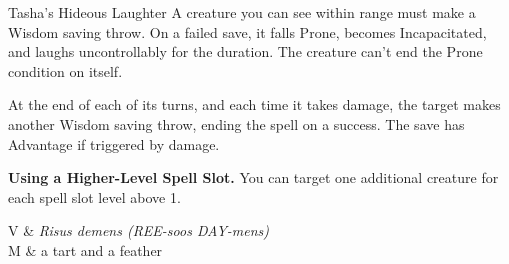 \begin{Spell}[
  tags=Concentration,
  level={1st},
  time={1 action},
  range={30 ft},
  components={V, S, M},
  duration={1 minute},
  school={Enchantment},
  attack={WIS Save},
  effect={Control}
]{Tasha's Hideous Laughter}
A creature you can see within range must make a Wisdom saving throw. On a failed save, it falls Prone, becomes Incapacitated, and laughs uncontrollably for the duration. The creature can't end the Prone condition on itself.

At the end of each of its turns, and each time it takes damage, the target makes another Wisdom saving throw, ending the spell on a success. The save has Advantage if triggered by damage.

\textbf{Using a Higher-Level Spell Slot.} You can target one additional creature for each spell slot level above 1.

\begin{components}
V & \textit{Risus demens (REE-soos DAY-mens)} \\
M & a tart and a feather
\end{components}
\end{Spell}


